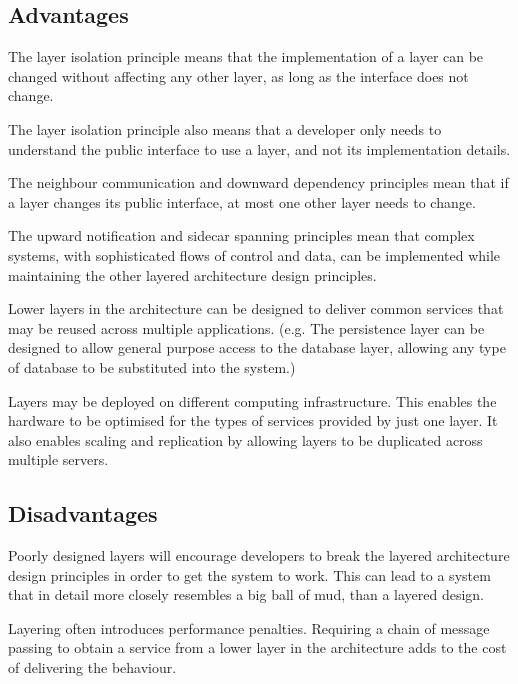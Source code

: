 \subsection{Advantages}
The layer isolation principle means that the implementation of a layer can be changed without affecting any other layer,
as long as the interface does not change.

The layer isolation principle also means that a developer only needs to understand the public interface to use a layer, and not its implementation details.

The neighbour communication and downward dependency principles mean that if a layer changes its public interface, at most one other layer needs to change.

The upward notification and sidecar spanning principles mean that complex systems, with sophisticated flows of control and data,
can be implemented while maintaining the other layered architecture design principles.

Lower layers in the architecture can be designed to deliver common services that may be reused across multiple applications.
(e.g. The persistence layer can be designed to allow general purpose access to the database layer, allowing any type of database to be substituted into the system.)

Layers may be deployed on different computing infrastructure. This enables the hardware to be optimised for the types of services provided by just one layer.
It also enables scaling and replication by allowing layers to be duplicated across multiple servers.

\subsection{Disadvantages}
Poorly designed layers will encourage developers to break the layered architecture design principles in order to get the system to work.
This can lead to a system that in detail more closely resembles a big ball of mud, than a layered design.

Layering often introduces performance penalties.
Requiring a chain of message passing to obtain a service from a lower layer in the architecture adds to the cost of delivering the behaviour.